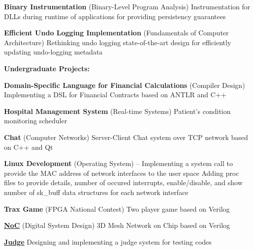 \documentclass[a4paper,9pt,oneside]{article}
\begin{document}
\begin{body}
\BulletItem
\textbf{Binary Instrumentation}
(Binary-Level Program Analysis)
\hfill
{}
\SubBulletItem
Instrumentation for DLLs during runtime of applications for providing persistency guarantees

\BulletItem
{\textbf{Efficient Undo Logging Implementation}}
(Fundamentals of Computer Architecture)
\hfill
{}
\SubBulletItem
Rethinking undo logging state-of-the-art design for efficiently updating undo-logging metadata

\textbf{Undergraduate Projects:}

\BulletItem
\textbf{Domain-Specific Language for Financial Calculations} (Compiler Design)
\hfill
{}
\SubBulletItem
Implementing a DSL for Financial Contracts based on ANTLR and C++

\BulletItem
\textbf{Hospital Management System} (Real-time Systems)
\hfill
{}
\SubBulletItem
Patient's condition monitoring scheduler


\BulletItem
\textbf{Chat} (Computer Networks)
\hfill
{}
\SubBulletItem
Server-Client Chat system over TCP network based on C++ and Qt

\BulletItem
\textbf{Linux Development} (Operating System)
\hfill
{} -- 
\SubBulletItem
Implementing a system call to provide the MAC address of network interfaces to the user space
\SubBulletItem
Adding proc files to provide details, number of occured interrupts, enable/disable, and show number of sk\_buff data structures for each network interface

\BulletItem
\textbf{Trax Game} (FPGA National Contest)
\hfill
{}
\SubBulletItem
Two player game based on Verilog

\BulletItem
\href{https://github.com/arminvakil/NoC}
{\textbf{NoC}} (Digital System Design)
\hfill
{}
\SubBulletItem
3D Mesh Network on Chip based on Verilog

\BulletItem
\href{https://github.com/Rmin1995/Judge}
{\textbf{Judge}}
\hfill
{}
\SubBulletItem
Designing and implementing a judge system for testing codes


\end{body}
\end{document}
